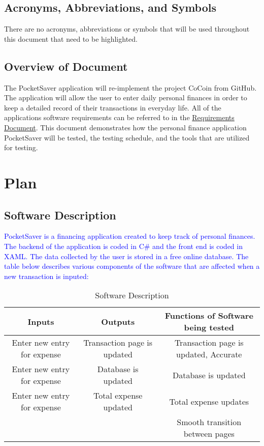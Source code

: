 \documentclass[12pt, titlepage]{article}
\begin{document}
\subsection{Acronyms, Abbreviations, and Symbols}
There are no acronyms, abbreviations or symbols that will be used throughout this document that need to be highlighted. 
	
\subsection{Overview of Document}
The PocketSaver application will re-implement the project CoCoin from GitHub. The application will allow the user to enter daily personal finances in order to keep a detailed record of their transactions in everyday life. All of the applications software requirements can be referred to in the \href{run:../SRS/SRS.pdf}{Requirements Document}. This document demonstrates how the personal finance application PocketSaver will be tested, the testing schedule, and the tools that are utilized for testing.

\section{Plan}
	
\subsection{Software Description}
\textcolor{blue}{PocketSaver is a financing application created to keep track of personal finances. The backend of the application is coded in C\# and the front end is coded in XAML. The data collected by the user is stored in a free online database. The table below describes various components of the software that are affected when a new transaction is inputed: }

\begin{table}[ht]
\caption{Software Description} 
\begin{adjustbox}{width=\textwidth,totalheight=\textheight,keepaspectratio}
\begin{tabular}{|c| |c|  |c|} 
\hline
Inputs & Outputs & Functions of Software being tested \\ 
\hline 
Enter new entry for expense & Transaction page is updated & Transaction page is updated, Accurate\\ 
\hline
Enter new entry for expense& Database is updated & Database is updated \\ 
\hline
Enter new entry for expense& Total expense updated & Total expense updates \\ 
\hline
&  &Smooth transition between pages \\ 
\hline 
\end{tabular}
\label{table:nonlin} 
\end{adjustbox}
\end{table}
\end{document}
